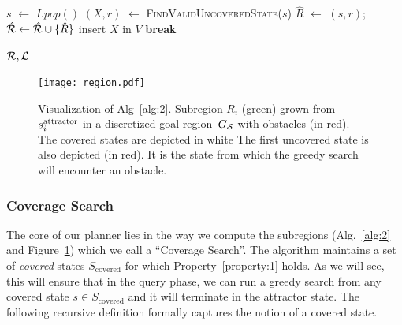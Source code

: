 \documentclass[a4paper]{report}
\begin{document}
\begin{algorithm}[t]
\begin{algorithmic}[1]
\vspace{2mm}        
        
         \label{alg:1:iv_loop}
            \State $s$ $\leftarrow$ $I.pop()$
            
\State $(X, r)$ $\leftarrow$ \textsc{FindValidUncoveredState}($s$)
                \State $\hat{R}$ $\leftarrow$ $(s,r)$;
        \hspace{2mm}
        $\hat{\mathcal{R}} \leftarrow \hat{\mathcal{R}} \cup \{ \hat{R} \}$   \label{alg:1:iv_region}
                    \label{alg:1:x_states}
                    \State insert $X$ in $V$
                    \State \textbf{break} \label{alg:1:break}
                \EndIf
            \EndIf
        \EndWhile
    \EndWhile

  \vspace{2mm}

  \State \Return $\mathcal{R}, \mathcal{L}$
\EndProcedure
\end{algorithmic}
\end{algorithm}

\begin{figure}[tb]
  \centering
     \texttt{[image: region.pdf]}
  \caption{
  Visualization of Alg~\ref{alg:2}. Subregion $R_i$ (green) grown from $s^{\text{attractor}}_i$ in a discretized goal region~$G_\mathcal{S}$ with obstacles (in red). The covered states are depicted in white
  The first uncovered state is also depicted (in red). It is the state from which the greedy search will encounter an obstacle.
}
    \label{fig:alg2}
\end{figure}

\subsubsection{Coverage Search}
The core of our planner lies in the way we compute the subregions (Alg.~\ref{alg:2} and Figure~\ref{fig:alg2}) which we call a ``Coverage Search''. The algorithm maintains a set of \emph{covered} states $S_{\text{covered}}$ for which Property~\ref{property:1} holds.
As we will see, this will ensure that in the query phase, we can run a greedy search from any covered state $s \in S_{\text{covered}}$ and it will terminate in the attractor state. 
%
The following recursive definition formally captures the notion of a covered state.
\end{document}
